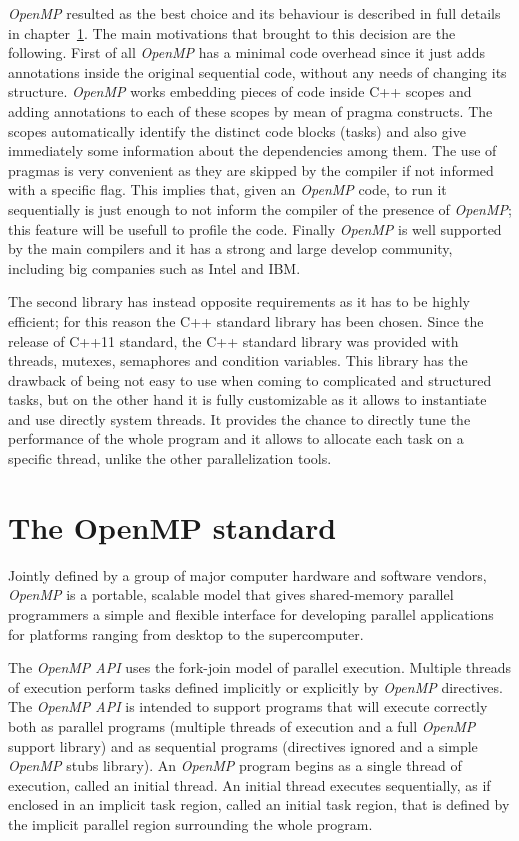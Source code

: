 \documentclass[a4paper,11pt,oneside]{book}
\begin{document}
\emph{OpenMP} resulted as the best choice and its behaviour is described in full details in chapter~\ref{openmp}. The main motivations that brought to this decision are the following. First of all  \emph{OpenMP} has a minimal code overhead since it just adds annotations inside the original sequential code, without any needs of changing its structure.  \emph{OpenMP} works embedding pieces of code inside C++ scopes and adding annotations to each of these scopes by mean of pragma constructs. The scopes automatically identify the distinct code blocks (tasks) and also give immediately some information about the dependencies among them. The use of pragmas is very convenient as they are skipped by the compiler if not informed with a specific flag. This implies that, given an  \emph{OpenMP} code, to run it sequentially is just enough to not inform the compiler of the presence of  \emph{OpenMP}; this feature will be usefull to profile the code. Finally  \emph{OpenMP} is well supported by the main compilers and it has a strong and large develop community, including big companies such as Intel and IBM.  

The second library has instead opposite requirements as it has to be highly efficient; for this reason the C++ standard library has been chosen. Since the release of C++11 standard, the C++ standard library was provided with threads, mutexes, semaphores and condition variables. This library has the drawback of being not easy to use when coming to complicated and structured tasks, but on the other hand it is fully customizable as it allows to instantiate and use directly system threads. It provides the chance to directly tune the performance of the whole program and it allows to allocate each task on a specific thread, unlike the other parallelization tools.

\section{The OpenMP standard}
\label{openmp}

Jointly defined by a group of major computer hardware and software vendors, \emph{OpenMP} is a portable, scalable model that gives shared-memory parallel programmers a simple and flexible interface for developing parallel applications for platforms ranging from desktop to the supercomputer.

The \emph{OpenMP API} uses the fork-join model of parallel execution. Multiple threads of execution perform tasks defined implicitly or explicitly by \emph{OpenMP} directives. The \emph{OpenMP API} is intended to support programs that will execute correctly both as parallel programs (multiple threads of execution and a full \emph{OpenMP} support library) and as sequential programs (directives ignored and a simple \emph{OpenMP} stubs library).
An \emph{OpenMP} program begins as a single thread of execution, called an initial thread. An initial thread executes sequentially, as if enclosed in an implicit task region, called an initial task region, that is defined by the implicit parallel region surrounding the whole program.
\end{document}
